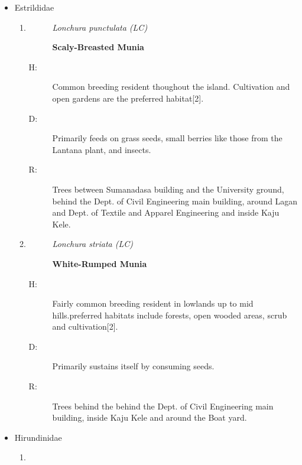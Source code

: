 \begin{itemize}
\begin{enumerate}
\begin{description}
Throughout the university specially around Sumandasa building, Kaju Kele area and open area behind the steel building.%
\end{description}%
\end{enumerate}%
\item%
Estrildidae%
\begin{enumerate}%
\item%
\begin{description}%
\item[]%
\textit{Lonchura punctulata (LC)}%
\item[]%
\textbf{Scaly{-}Breasted Munia}%
\end{description}%
\begin{description}%
\item[H: ]%
Common breeding resident thoughout the island. Cultivation and open gardens are the preferred habitat{[}2{]}.%
\item[D: ]%
Primarily feeds on grass seeds, small berries like those from the Lantana plant, and insects.%
\item[R: ]%
Trees between Sumanadasa building and the University ground, behind the Dept. of Civil Engineering main building, around Lagan and Dept. of Textile and Apparel Engineering and inside Kaju Kele.%
\end{description}%
\item%
\begin{description}%
\item[]%
\textit{Lonchura striata (LC)}%
\item[]%
\textbf{White{-}Rumped Munia}%
\end{description}%
\begin{description}%
\item[H: ]%
Fairly common breeding resident in lowlands up to mid hills.preferred habitats include forests, open wooded areas, scrub and cultivation{[}2{]}.%
\item[D: ]%
Primarily sustains itself by consuming seeds.%
\item[R: ]%
Trees behind the behind the Dept. of Civil Engineering main building, inside Kaju Kele and around the Boat yard.%
\end{description}%
\end{enumerate}%
\item%
Hirundinidae%
\begin{enumerate}%
\item%
\begin{description}%
\item[]%

\end{description}
\end{enumerate}
\end{itemize}
